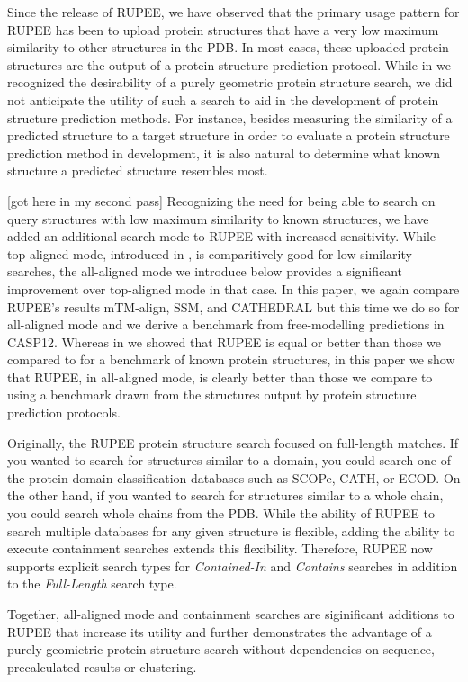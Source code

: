 \documentclass[10pt,letterpaper]{article}
\begin{document}
Since the release of RUPEE, we have observed that the primary usage pattern for RUPEE has been to upload protein structures that have a very low maximum similarity to other structures in the PDB.
In most cases, these uploaded protein structures are the output of a protein structure prediction protocol. 
While in \cite{Ayoub2019} we recognized the desirability of a purely geometric protein structure search, we did not anticipate the utility of such a search to aid in the development of protein structure prediction methods.
For instance, besides measuring the similarity of a predicted structure to a target structure in order to evaluate a protein structure prediction method in development, it is also natural to determine what known structure a predicted structure resembles most. 

[got here in my second pass]
Recognizing the need for being able to search on query structures with low maximum similarity to known structures, we have added an additional search mode to RUPEE with increased sensitivity. 
While top-aligned mode, introduced in \cite{Ayoub2019}, is comparitively good for low similarity searches, the all-aligned mode we introduce below provides a significant improvement over top-aligned mode in that case.  
In this paper, we again compare RUPEE's results mTM-align, SSM, and CATHEDRAL but this time we do so for all-aligned mode and we derive a benchmark from free-modelling predictions in CASP12. 
Whereas in \cite{Ayoub2019} we showed that RUPEE is equal or better than those we compared to for a benchmark of known protein structures, in this paper we show that RUPEE, in all-aligned mode, is clearly better than those we compare to using a benchmark drawn from the structures output by protein structure prediction protocols. 

Originally, the RUPEE protein structure search focused on full-length matches. 
If you wanted to search for structures similar to a domain, you could search one of the protein domain classification databases such as SCOPe, CATH, or ECOD.
On the other hand, if you wanted to search for structures similar to a whole chain, you could search whole chains from the PDB. 
While the ability of RUPEE to search multiple databases for any given structure is flexible, adding the ability to execute containment searches extends this flexibility.
Therefore, RUPEE now supports explicit search types for \emph{Contained-In} and \emph{Contains} searches in addition to the \emph{Full-Length} search type.

Together, all-aligned mode and containment searches are siginificant additions to RUPEE that increase its utility and further demonstrates the advantage of a purely geomietric protein structure search without dependencies on sequence, precalculated results or clustering.
\end{document}
